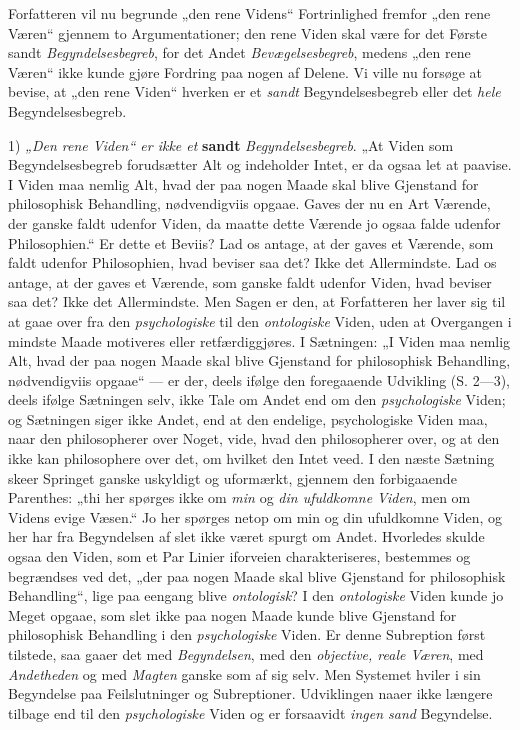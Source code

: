 \documentclass[12pt,a4paper]{book}
\newcommand{\opage}[1]{\marginnote{\footnotesize\textit{[#1]}}}
\begin{document}
Forfatteren vil nu begrunde „den rene Videns“ Fortrinlighed
fremfor „den rene Væren“ gjennem to Argumentationer;
den rene Viden skal være for det Første
sandt \emph{Begyndelsesbegreb}, for det Andet \emph{Bevægelsesbegreb},
medens „den rene Væren“ ikke kunde gjøre
Fordring paa nogen af Delene. Vi ville nu forsøge at
bevise, at „den rene Viden“ hverken er et \emph{sandt} Begyndelsesbegreb
eller det \emph{hele} Begyndelsesbegreb.

1) \emph{„Den rene Viden“ er ikke et} \textbf{sandt} \emph{Begyndelsesbegreb}.
„At Viden som Begyndelsesbegreb forudsætter
Alt og indeholder Intet, er da ogsaa let at
paavise. I Viden maa nemlig Alt, hvad der paa nogen
Maade skal blive Gjenstand for philosophisk Behandling,
nødvendigviis opgaae. Gaves der nu en Art Værende,
der ganske faldt udenfor Viden, da maatte dette Værende
jo ogsaa falde udenfor Philosophien.“ Er dette et Beviis?
Lad os antage, at der gaves et Værende, som
faldt udenfor Philosophien, hvad beviser saa det? Ikke
det Allermindste. Lad os antage, at der gaves et Væ\opage{65}\setcounter{footnote}{0}rende,
som ganske faldt udenfor Viden, hvad beviser saa
det? Ikke det Allermindste. Men Sagen er den, at
Forfatteren her laver sig til at gaae over fra den \emph{psychologiske}
til den \emph{ontologiske} Viden, uden at Overgangen
i mindste Maade motiveres eller retfærdiggjøres.
I Sætningen: „I Viden maa nemlig Alt, hvad der
paa nogen Maade skal blive Gjenstand for philosophisk
Behandling, nødvendigviis opgaae“ --- er der, deels
ifølge den foregaaende Udvikling (S. 2---3), deels ifølge
Sætningen selv, ikke Tale om Andet end om den \emph{psychologiske}
Viden; og Sætningen siger ikke Andet, end at
den endelige, psychologiske Viden maa, naar den philosopherer
over Noget, vide, hvad den philosopherer over,
og at den ikke kan philosophere over det, om hvilket
den Intet veed. I den næste Sætning skeer Springet
ganske uskyldigt og uformærkt, gjennem den forbigaaende
Parenthes: „thi her spørges ikke om \emph{min} og
\emph{din ufuldkomne Viden}, men om Videns evige Væsen.“
Jo her spørges netop om min og din ufuldkomne
Viden, og her har fra Begyndelsen af slet ikke været spurgt
om Andet. Hvorledes skulde ogsaa den Viden, som et Par
Linier iforveien charakteriseres, bestemmes og begrændses ved
det, „der paa nogen Maade skal blive Gjenstand for philosophisk
Behandling“, lige paa eengang blive \emph{ontologisk}?
I den \emph{ontologiske} Viden kunde jo Meget opgaae, som
slet ikke paa nogen Maade kunde blive Gjenstand for
philosophisk Behandling i den \emph{psychologiske} Viden.
Er denne Subreption først tilstede, saa gaaer det med
\emph{Begyndelsen}, med den \emph{objective, reale Væren},
med \emph{Andetheden} og med \emph{Magten} ganske som af sig selv.
\opage{66}\setcounter{footnote}{0}%
Men Systemet hviler i sin Begyndelse paa Feilslutninger
og Subreptioner. Udviklingen naaer ikke længere tilbage
end til den \emph{psychologiske} Viden og er forsaavidt
\emph{ingen sand} Begyndelse.
\end{document}

